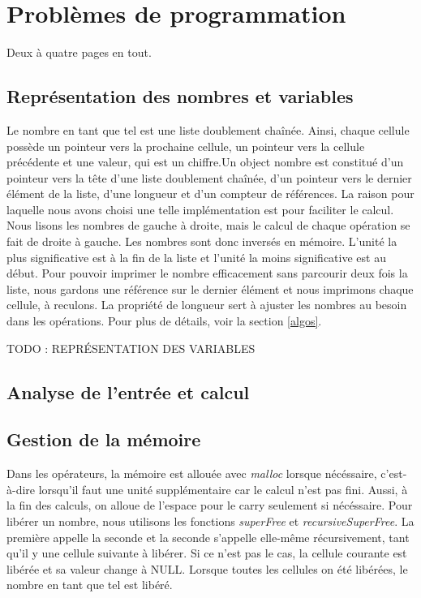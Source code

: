 \documentclass[letterpaper,12pt]{scrartcl}
\begin{document}
    
	\section{Problèmes de programmation}
        Deux à quatre pages en tout.
        
		\subsection{Représentation des nombres et variables}
		Le nombre en tant que tel est une liste doublement chaînée. Ainsi, chaque cellule possède un pointeur vers la prochaine cellule, un pointeur vers la cellule précédente et une valeur, qui est un chiffre.Un object nombre est constitué d'un pointeur vers la tête d'une liste doublement chaînée, d'un pointeur vers le dernier élément de la liste, d'une longueur et d'un compteur de références. La raison pour laquelle nous avons choisi une telle implémentation est pour faciliter le calcul. Nous lisons les nombres de gauche à droite, mais le calcul de chaque opération se fait de droite à gauche. Les nombres sont donc inversés en mémoire. L'unité la plus significative est à la fin de la liste et l'unité la moins significative est au début. Pour pouvoir imprimer le nombre efficacement sans parcourir deux fois la liste, nous gardons une référence sur le dernier élément et nous imprimons chaque cellule, à reculons. La propriété de longueur sert à ajuster les nombres au besoin dans les opérations. Pour plus de détails, voir la section \ref{algos}.

		TODO : REPRÉSENTATION DES VARIABLES
        
        \subsection{Analyse de l'entrée et calcul}
            
        
        \subsection{Gestion de la mémoire}
        Dans les opérateurs, la mémoire est allouée avec \textit{malloc} lorsque nécéssaire, c'est-à-dire lorsqu'il faut une unité supplémentaire car le calcul n'est pas fini. Aussi, à la fin des calculs, on alloue de l'espace pour le carry seulement si nécéssaire. Pour libérer un nombre, nous utilisons les fonctions \textit{superFree} et \textit{recursiveSuperFree}. La première appelle la seconde et la seconde s'appelle elle-même récursivement, tant qu'il y une cellule suivante à libérer. Si ce n'est pas le cas, la cellule courante est libérée et sa valeur change à NULL. Lorsque toutes les cellules on été libérées, le nombre en tant que tel est libéré.
         
\end{document}

